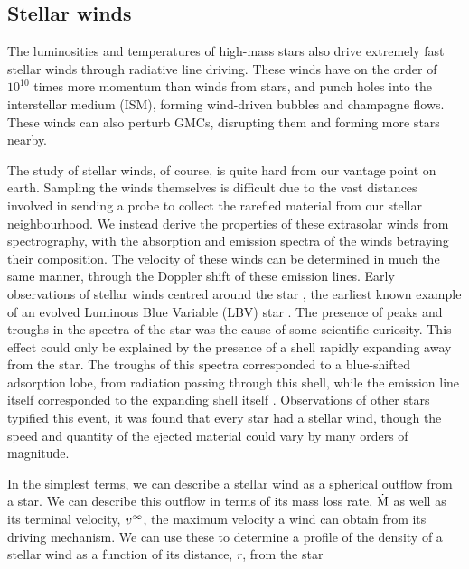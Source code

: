 \subsection{Stellar winds}
\label{sec:stellarwinds}

The luminosities and temperatures of high-mass stars also drive extremely fast stellar winds through radiative line driving.
These winds have on the order of $10^{10}$ times more momentum than winds from  stars, and punch holes into the interstellar medium (ISM), forming wind-driven bubbles and champagne flows.
These winds can also perturb GMCs, disrupting them and forming more stars nearby.

The study of stellar winds, of course, is quite hard from our vantage point on earth.
Sampling the winds themselves is difficult due to the vast distances involved in sending a probe to collect the rarefied material from our stellar neighbourhood.
We instead derive the properties of these extrasolar winds from spectrography, with the absorption and emission spectra of the winds betraying their composition.
The velocity of these winds can be determined in much the same manner, through the Doppler shift of these emission lines.
Early observations of stellar winds centred around the star , the earliest known example of an evolved Luminous Blue Variable (LBV) star .
The presence of peaks and troughs in the spectra of the star was the cause of some scientific curiosity.
This effect could only be explained by the presence of a shell rapidly expanding away from the star.
The troughs of this spectra corresponded to a blue-shifted adsorption lobe, from radiation passing through this shell, while the emission line itself corresponded to the expanding shell itself \parencite{bealsNatureWolfRayetEmission1929,lamersIntroductionStellarWinds1999}.
Observations of other stars typified this event, it was found that every star had a stellar wind, though the speed and quantity of the ejected material could vary by many orders of magnitude.

In the simplest terms, we can describe a stellar wind as a spherical outflow from a star.
We can describe this outflow in terms of its mass loss rate, $\dot{\text{M}}$ as well as its terminal velocity, $v^\infty$, the maximum velocity a wind can obtain from its driving mechanism.
We can use these to determine a profile of the density of a stellar wind as a function of its distance, $r$, from the star

